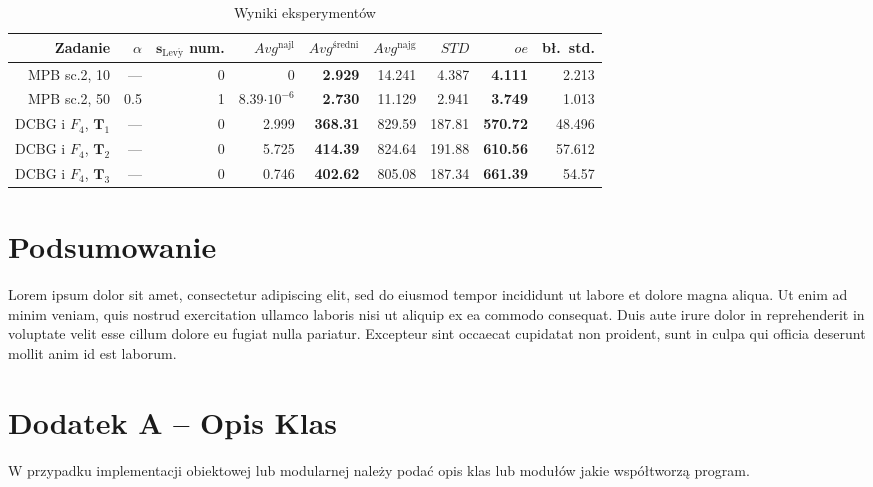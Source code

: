 \documentclass[final,a4paper,openany,12pt]{mwbk}
\begin{document}
\begin{table}[ht!]
\centering
\caption{Wyniki eksperymentów}
{\renewcommand{\arraystretch}{1.2}
{\footnotesize
\begin{tabular}{|r||r|r||r|r|r|r||r|r|}\hline
Zadanie & $\alpha$ & $\textbf{s}_{\mathrm{Lev\acute{y}}}$ num. & $Avg^\mathrm{najl}$ & $Avg^\mathrm{średni}$ & $Avg^\mathrm{najg}$ & $STD$ & $oe$ & bł.~std. \\\hline\hline
MPB sc.2, 10 &---& 0 & 0                   & \textbf{2.929} & 14.241 & 4.387 & \textbf{4.111} & 2.213 \\
\hline
MPB sc.2, 50 &0.5& 1 & 8.39$\cdot 10^{-6}$ & \textbf{2.730} & 11.129 & 2.941 & \textbf{3.749} & 1.013 \\
\hline
\hline
DCBG i $F_4$, $\mathbf{T}_1$ & ---  & 0 & 2.999 & \textbf{368.31} & 829.59 & 187.81 & \textbf{570.72} & 48.496  \\
\hline
DCBG i $F_4$, $\mathbf{T}_2$ & ---  & 0 & 5.725 & \textbf{414.39} & 824.64 & 191.88 & \textbf{610.56} & 57.612 \\
\hline
DCBG i $F_4$, $\mathbf{T}_3$ & ---  & 0 & 0.746 & \textbf{402.62} & 805.08 & 187.34 & \textbf{661.39} & 54.57 \\
\hline
\end{tabular}
}
}
\label{TableTheSameConf}
\end{table}

\chapter*{Podsumowanie}

Lorem ipsum dolor sit amet, consectetur adipiscing elit, sed do eiusmod tempor incididunt ut labore et dolore magna aliqua. Ut enim ad minim veniam, quis nostrud exercitation ullamco laboris nisi ut aliquip ex ea commodo consequat. Duis aute irure dolor in reprehenderit in voluptate velit esse cillum dolore eu fugiat nulla pariatur. Excepteur sint occaecat cupidatat non proident, sunt in culpa qui officia deserunt mollit anim id est laborum.




\chapter*{Dodatek A -- Opis Klas}

W przypadku implementacji obiektowej lub modularnej należy podać opis klas lub modułów jakie współtworzą program.
\end{document}
